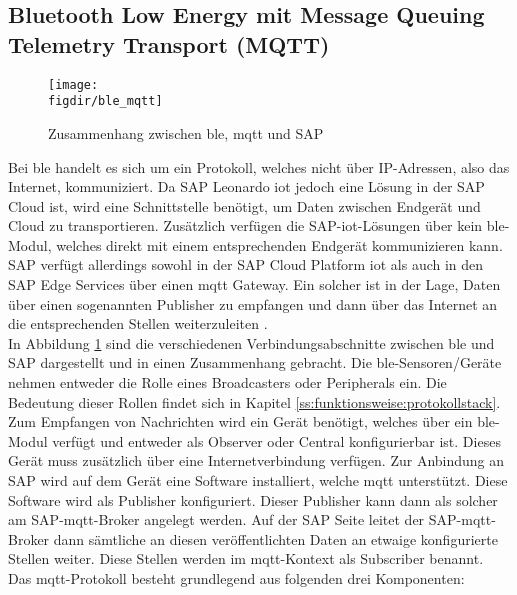 \subsection{Bluetooth Low Energy mit Message Queuing Telemetry Transport (MQTT)}
\label{ss:interface:ble}

\begin{figure}[!b]
	\centering
	\texttt{[image: \\figdir/ble\_mqtt]}
	\caption[Zusammenhang zwischen \ac{ble}, \ac{mqtt} und SAP]{Zusammenhang zwischen \ac{ble}, \ac{mqtt} und SAP \cite[Seite 3f]{Zivkovic20:MQTT} \cite[Seite 230f]{Holtschulte20:IOS}}
	\label{FIG:mqtt}
\end{figure}

\noindent Bei \ac{ble} handelt es sich um ein Protokoll, welches nicht über IP-Adressen, also das Internet, kommuniziert. Da SAP Leonardo \ac{iot} jedoch eine Lösung in der SAP Cloud ist, wird eine Schnittstelle benötigt, um Daten zwischen Endgerät und Cloud zu transportieren. Zusätzlich verfügen die SAP-\ac{iot}-Lösungen über kein \ac{ble}-Modul, welches direkt mit einem entsprechenden Endgerät kommunizieren kann. SAP verfügt allerdings sowohl in der SAP Cloud Platform \ac{iot} als auch in den SAP Edge Services über einen \ac{mqtt} Gateway. Ein solcher ist in der Lage, Daten über einen sogenannten Publisher zu empfangen und dann über das Internet an die entsprechenden Stellen weiterzuleiten \cite[Seite Seite 230f]{Holtschulte20:IOS}.\\
\noindent In Abbildung \ref{FIG:mqtt} sind die verschiedenen Verbindungsabschnitte zwischen \ac{ble} und SAP dargestellt und in einen Zusammenhang gebracht. Die \ac{ble}-Sensoren/Geräte nehmen entweder die Rolle eines Broadcasters oder Peripherals ein. Die Bedeutung dieser Rollen findet sich in Kapitel \ref{ss:funktionsweise:protokollstack}. Zum Empfangen von Nachrichten wird ein Gerät benötigt, welches über ein \ac{ble}-Modul verfügt und entweder als Observer oder Central konfigurierbar ist. Dieses Gerät muss zusätzlich über eine Internetverbindung verfügen. Zur Anbindung an SAP wird auf dem Gerät eine Software installiert, welche \ac{mqtt} unterstützt. Diese Software wird als Publisher konfiguriert. Dieser Publisher kann dann als solcher am SAP-\ac{mqtt}-Broker angelegt werden. Auf der SAP Seite leitet der SAP-\ac{mqtt}-Broker dann sämtliche an diesen veröffentlichten Daten an etwaige konfigurierte Stellen weiter. Diese Stellen werden im \ac{mqtt}-Kontext als Subscriber benannt.\\
\noindent Das \ac{mqtt}-Protokoll besteht grundlegend aus folgenden drei Komponenten:
